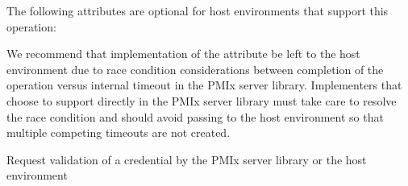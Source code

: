 \reqattrend

\optattrstart
The following attributes are optional for host environments that support this operation:


\optattrend

\adviceimplstart
We recommend that implementation of the  attribute be left to the host environment due to race condition considerations between completion of the operation versus internal timeout in the \ac{PMIx} server library. Implementers that choose to support  directly in the \ac{PMIx} server library must take care to resolve the race condition and should avoid passing  to the host environment so that multiple competing timeouts are not created.
\adviceimplend


\descr

Request validation of a credential by the \ac{PMIx} server library or the host environment



